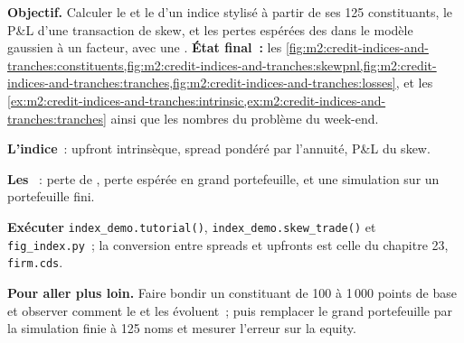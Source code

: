 \begin{tutorial}
\textbf{Objectif.} Calculer le  et le  d'un indice stylisé à partir de ses 125
constituants, le P\&L d'une transaction de skew, et les pertes espérées des  dans le modèle
gaussien à un facteur, avec une .
\textbf{État final~:} les \cref{fig:m2:credit-indices-and-tranches:constituents,fig:m2:credit-indices-and-tranches:skewpnl,fig:m2:credit-indices-and-tranches:tranches,fig:m2:credit-indices-and-tranches:losses},
et les \cref{ex:m2:credit-indices-and-tranches:intrinsic,ex:m2:credit-indices-and-tranches:tranches}
ainsi que les nombres du problème du week-end.
\begin{tutsteps}
\item \textbf{L'indice}~: upfront intrinsèque, spread pondéré par l'annuité, P\&L du skew.
\label{lst:m2:credit-indices-and-tranches:index}
\item \textbf{Les }~: perte de , perte espérée en grand portefeuille,  et une
simulation sur un portefeuille fini.
\label{lst:m2:credit-indices-and-tranches:tranche}
\item \textbf{Exécuter} \texttt{index\_demo.tutorial()}, \texttt{index\_demo.skew\_trade()} et
\texttt{fig\_index.py}~; la conversion entre spreads et upfronts est celle du chapitre 23,
\texttt{firm.cds}.
\end{tutsteps}
\textbf{Pour aller plus loin.} Faire bondir un constituant de 100 à 1\,000 points de base et
observer comment le  et les  évoluent~; puis remplacer le grand portefeuille par
la simulation finie à 125 noms et mesurer l'erreur sur la  equity.
\end{tutorial}

